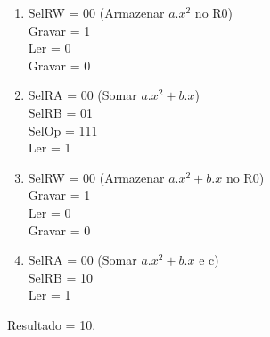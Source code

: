 \documentclass[]{article}
\begin{document}
\begin{enumerate}
			\item SelRW = 00 (Armazenar $a.x^2$ no R0)
			\\ Gravar = 1
			\\ Ler = 0 
			\\ Gravar = 0
			
			\item SelRA = 00 (Somar $a.x^2 + b.x$)
			\\ SelRB = 01
			\\ SelOp = 111
			\\ Ler = 1
			
			\item SelRW = 00 (Armazenar $a.x^2 + b.x$ no R0)
			\\ Gravar = 1
			\\ Ler = 0
			\\ Gravar = 0 
			
			\item SelRA = 00 (Somar $a.x^2 + b.x$ e c)
			\\ SelRB = 10
			\\ Ler = 1
			
		\end{enumerate}
		Resultado = 10.
		
\end{document}
